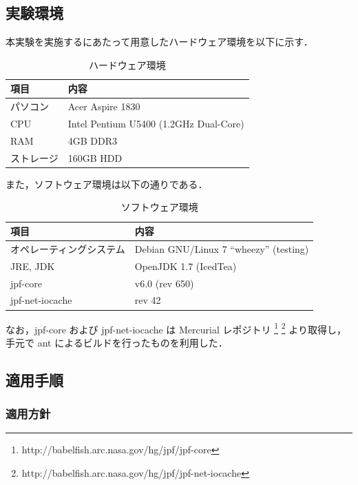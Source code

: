 \documentclass[a4j,12pt]{jarticle}
\begin{document}
\subsection{実験環境}

本実験を実施するにあたって用意したハードウェア環境を以下に示す．

\begin{table}[here]
\caption[ハードウェア環境]{ハードウェア環境}
\label{table:hardware-env}
\begin{center}
\begin{tabular}{ll}
\toprule
項目 & 内容 \\
\midrule
パソコン & Acer Aspire 1830 \\
CPU & Intel Pentium U5400 (1.2GHz Dual-Core) \\
RAM & 4GB DDR3 \\
ストレージ & 160GB HDD \\
\bottomrule
\end{tabular}
\end{center}
\end{table}

また，ソフトウェア環境は以下の通りである．

\begin{table}[here]
\caption[ソフトウェア環境]{ソフトウェア環境}
\label{table:software-env}
\begin{center}
\begin{tabular}{ll}
\toprule
項目 & 内容 \\
\midrule
オペレーティングシステム & Debian GNU/Linux 7 ``wheezy'' (testing) \\
JRE, JDK & OpenJDK 1.7 (IcedTea) \\
jpf-core & v6.0 (rev 650) \\
jpf-net-iocache & rev 42 \\
\bottomrule
\end{tabular}
\end{center}
\end{table}

なお，jpf-core および jpf-net-iocache は Mercurial レポジトリ \footnote{http://babelfish.arc.nasa.gov/hg/jpf/jpf-core} \footnote{http://babelfish.arc.nasa.gov/hg/jpf/jpf-net-iocache} より取得し，手元で ant によるビルドを行ったものを利用した．

\subsection{適用手順}

\subsubsection{適用方針}
\end{document}
